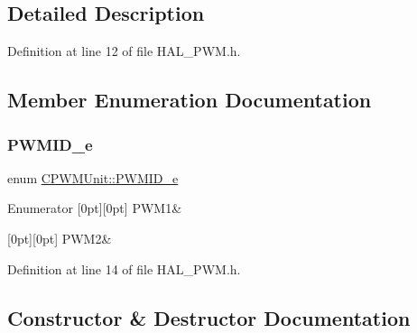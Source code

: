 \subsection{Detailed Description}


Definition at line 12 of file H\+A\+L\+\_\+\+P\+W\+M.\+h.



\subsection{Member Enumeration Documentation}
\mbox{\label{class_c_p_w_m_unit_ad3e55d1df0367d8a090d4b835704be44}} 
\subsubsection{\texorpdfstring{PWMID\_e}{PWMID\_e}}
{\footnotesize\ttfamily enum \mbox{\hyperlink{class_c_p_w_m_unit_ad3e55d1df0367d8a090d4b835704be44}{C\+P\+W\+M\+Unit\+::\+P\+W\+M\+I\+D\+\_\+e}}}

\begin{DoxyEnumFields}{Enumerator}
[0pt][0pt]{}\mbox{\label{class_c_p_w_m_unit_ad3e55d1df0367d8a090d4b835704be44a3f6167a7882e80f1ad05c8bff5e538c0}} 
P\+W\+M1&\\
\hline

[0pt][0pt]{}\mbox{\label{class_c_p_w_m_unit_ad3e55d1df0367d8a090d4b835704be44afc7888ea63be5da5551d10db3d676185}} 
P\+W\+M2&\\
\hline

\end{DoxyEnumFields}


Definition at line 14 of file H\+A\+L\+\_\+\+P\+W\+M.\+h.



\subsection{Constructor \& Destructor Documentation}
\mbox{\label{class_c_p_w_m_unit_a9e68713e9f26f6d36714a58648494afb}} 
